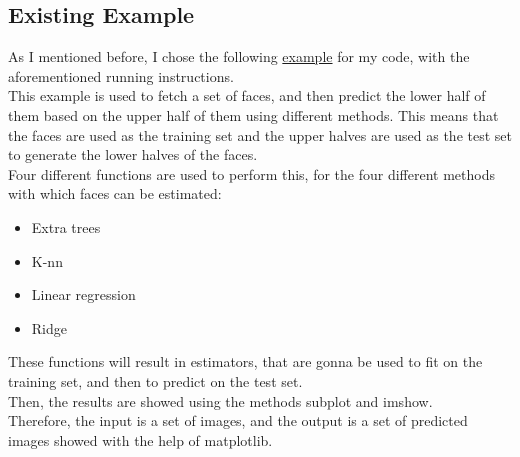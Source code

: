 \documentclass[a4paper,10pt]{article}
\newcommand\tab[1][0.5cm]{\hspace*{#1}}
\begin{document}
 \subsection{Existing Example}
  \tab As I mentioned before, I chose the following \href{http://scikit-learn.org/stable/auto_examples/plot_multioutput_face_completion.html#sphx-glr-auto-examples-plot-multioutput-face-completion-py}{example} for my code, with the aforementioned running instructions. \\
  \tab This example is used to fetch a set of faces, and then predict the lower half of them based on the upper half of them using different methods. This means that the faces are used as the training set and the upper halves are used as the test set to generate the lower halves of the faces.\\
  \tab Four different functions are used to perform this, for the four different methods with which faces can be estimated: 
\begin{itemize}
\item Extra trees
\item K-nn
\item Linear regression
\item Ridge
\end{itemize}
\tab These functions will result in estimators, that are gonna be used to fit on the training set, and then to predict on the test set. \\
\tab Then, the results are showed using the methods {\selectfont subplot} and {\selectfont imshow}. \\ 
\tab Therefore, the input is a set of images, and the output is a set of predicted images showed with the help of {\selectfont matplotlib}.
  
\end{document}
